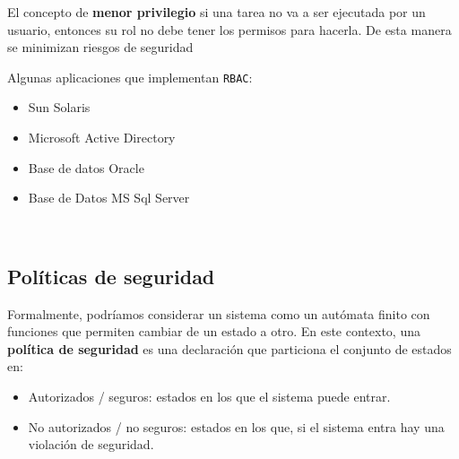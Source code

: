 \documentclass[]{article}
\begin{document}
El concepto de \textbf{menor privilegio} si una tarea no va a ser ejecutada por un usuario, entonces su rol no debe tener los permisos para hacerla. De esta manera se minimizan riesgos de seguridad


Algunas aplicaciones que implementan \texttt{RBAC}:
\begin{itemize}
	\item Sun Solaris
	\item Microsoft Active Directory
	\item Base de datos Oracle
	\item Base de Datos MS Sql Server
\end{itemize}


 ~\newline


\subsection{Políticas de seguridad}
Formalmente, podríamos considerar un sistema como un autómata finito con funciones que permiten cambiar de un estado a otro. En este contexto, una \textbf{política de seguridad} es una declaración que particiona el conjunto de estados en:

\begin{itemize}
	\item Autorizados / seguros: estados en los que el sistema puede entrar.
	\item No autorizados / no seguros: estados en los que, si el sistema entra hay una violación de seguridad.
\end{itemize}
\end{document}
